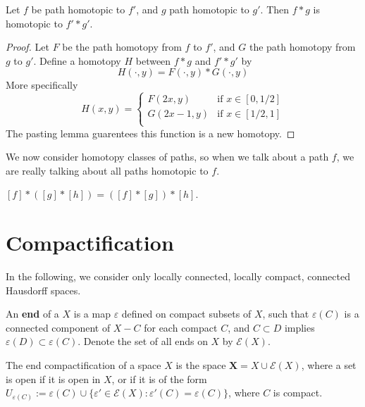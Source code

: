 \begin{theorem}
    Let $f$ be path homotopic to $f'$, and $g$ path homotopic to $g'$. Then $f * g$ is homotopic to $f' * g'$.
\end{theorem}
\begin{proof}
    Let $F$ be the path homotopy from $f$ to $f'$, and $G$ the path homotopy from $g$ to $g'$. Define a homotopy $H$ between $f * g$ and $f' * g'$ by
    \[ H(\cdot,y) = F(\cdot, y) * G(\cdot, y) \]
    More specifically
    \[ H(x,y) = \begin{cases}
        F(2x,y) & \text{if } x \in [0,1/2]\\
        G(2x - 1,y) & \text{if } x \in [1/2,1]\\
\end{cases} \]
    The pasting lemma guarentees this function is a new homotopy.
\end{proof}

We now consider homotopy classes of paths, so when we talk about a path $f$, we are really talking about all paths homotopic to $f$.

\begin{theorem}
    $[f] * ([g] * [h]) = ([f] * [g]) * [h]$.
\end{theorem}

\chapter{Compactification}

In the following, we consider only locally connected, locally compact, connected Hausdorff spaces.

\begin{definition}
    An {\bf end} of a $X$ is a map $\varepsilon$ defined on compact subsets of $X$, such that $\varepsilon(C)$ is a connected component of $X - C$ for each compact $C$, and $C \subset D$ implies $\varepsilon(D) \subset \varepsilon(C)$. Denote the set of all ends on $X$ by $\mathcal{E}(X)$.
\end{definition}

\begin{definition}
    The end compactification of a space $X$ is the space $\mathbf{X} = X \cup \mathcal{E}(X)$, where a set is open if it is open in $X$, or if it is of the form $U_{\varepsilon(C)} := \varepsilon(C) \cup \{ \varepsilon' \in \mathcal{E}(X) : \varepsilon'(C) = \varepsilon(C) \}$, where $C$ is compact.
\end{definition}

